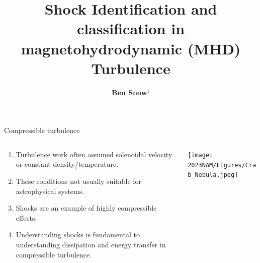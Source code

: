 \documentclass[10pt,aspectratio=169,usenames,dvipsnames]{beamer}
\title{Shock Identification and classification in magnetohydrodynamic (MHD) Turbulence}
\date{}
\author{\textbf{Ben Snow$^1$}}
\institute{$^1$University of Exeter \\ AAPPS-DPP, 15th November 2023.}
\begin{document}
\maketitle


\begin{frame}{Compressible turbulence}
\begin{columns}
\begin{column}{0.4\textwidth}
\begin{enumerate}
\item Turbulence work often assumed solenoidal velocity or constant density/temperature.
\item These conditions not usually suitable for astrophysical systems.
\item Shocks are an example of highly compressible effects.
\item Understanding shocks is fundamental to understanding dissipation and energy transfer in compressible turbulence.
\end{enumerate}
\end{column}
\begin{column}{0.6\textwidth}
\texttt{[image: 2023NAM/Figures/Crab\_Nebula.jpeg]}
\end{column}
\end{columns}
\end{frame}
\end{document}
